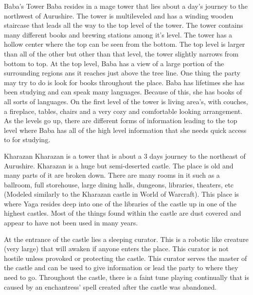 \begin{commentbox}{Baba's Tower}
	Baba resides in a mage tower that lies about a day's journey to the northwest of Aurushire. The tower is multileveled and has a winding wooden staircase that leads all the way to the top level of the tower. The tower contains many different books and brewing stations among it's level. The tower has a hollow center where the top can be seen from the bottom. The top level is larger than all of the other but other than that level, the tower slightly narrows from bottom to top. At the top level, Baba has a view of a large portion of the surrounding regions ans it reaches just above the tree line. One thing the party may try to do is look for books throughout the place. Baba has lifetimes she has been studying and can speak many languages. Because of this, she has books of all sorts of languages. On the first level of the tower is living area's, with couches, a fireplace, tables, chairs and a very cozy and comfortable looking arrangement. As the levels go up, there are different forms of information leading to the top level where Baba has all of the high level information that she needs quick access to for studying.
\end{commentbox}

\begin{commentbox}{Kharazan}
	Kharazan is a tower that is about a 3 days journey to the northeast of Aurushire. Kharazan is a huge but semi-deserted castle. The place is old and many parts of it are broken down. There are many rooms in it such as a ballroom, full storehouse, large dining halls, dungeons, libraries, theaters, etc (Modeled similarly to the Kharazan castle in World of Warcraft). This place is where Yaga resides deep into one of the libraries of the castle up in one of the highest castles. Most of the things found within the castle are dust covered and appear to have not been used in many years.
	
	At the entrance of the castle lies a sleeping curator. This is a robotic like creature (very large) that will awaken if anyone enters the place. This curator is not hostile unless provoked or protecting the castle. This curator serves the master of the castle and can be used to give information or lead the party to where they need to go. Throughout the castle, there is a faint tune playing continually that is caused by an enchantress' spell created after the castle was abandoned.
\end{commentbox}


